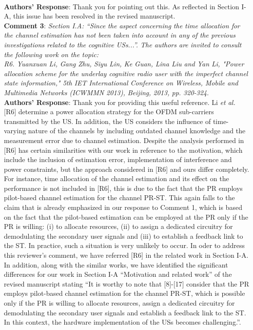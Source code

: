 \documentclass[12pt,a4wide,peerreview]{IEEEtran}
\newcommand{\tc}[1]{#1}
\begin{document}
\\
\textbf{Authors' Response}:
Thank you for pointing out this. As reflected in Section I-A, this issue has been resolved in the revised manuscript.
\\
\textbf{\tc{Comment 3}}: 
\textit{
Section I.A: ``Since the aspect concerning the time allocation for the channel estimation has not been taken into account in any of the previous investigations related to the cognitive USs...''. The authors are invited to consult the following work on the topic:
\\
R6. Yuanxuan Li, Gang Zhu, Siyu Lin, Ke Guan, Lina Liu and Yan Li, "Power allocation scheme for the underlay cognitive radio user with the imperfect channel state information," 5th IET International Conference on Wireless, Mobile and Multimedia Networks (ICWMMN 2013), Beijing, 2013, pp. 320-324. 
}
\\
\textbf{Authors' Response}:
Thank you for providing this useful reference. Li \textit{et al.} [R6] determine a power allocation strategy for the OFDM sub-carriers transmitted by the US. In addition, the US considers the influence of time-varying nature of the channels by including outdated channel knowledge and the measurement error due to channel estimation. Despite the analysis performed in [R6] has certain similarities with our work in reference to the motivation, which include the inclusion of estimation error, implementation of interference and power constraints, but the approach considered in [R6] and ours differ completely. For instance, time allocation of the channel estimation and its effect on the performance is not included in [R6], this is due to the fact that the PR employs pilot-based channel estimation for the channel PR-ST. This again falls to the claim that is already emphasized in our response to Comment 1, which is based on the fact that the pilot-based estimation can be employed at the PR only if the PR is willing: (i) to allocate resources, (ii) to assign a dedicated circuitry for demodulating the secondary user signals and (iii) to establish a feedback link to the ST. In practice, such a situation is very unlikely to occur. In oder to address this reviewer's comment, we have referred [R6] in the related work in Section I-A. In addition, along with the similar works, we have identified the significant differences for our work in Section I-A ``Motivation and related work'' of the revised manuscript stating ``It is worthy to note that [8]-[17] consider that the PR employs pilot-based channel estimation for the channel PR-ST, which is possible only if the PR is willing to allocate resources, assign a dedicated circuitry for demodulating the secondary user signals and establish a feedback link to the ST. In this context, the hardware implementation of the USs becomes challenging.''. 
\end{document}
